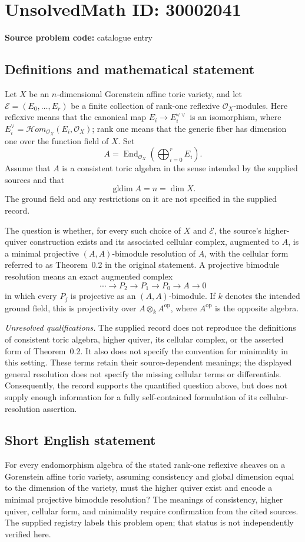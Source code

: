\documentclass[11pt]{article}
\begin{document}
\section*{UnsolvedMath ID: 30002041}
\textbf{Source problem code:} catalogue entry
\subsection{Definitions and mathematical statement}
Let \(X\) be an \(n\)-dimensional Gorenstein affine toric variety, and let \(\mathcal E=(E_0,\ldots,E_r)\) be a finite collection of rank-one reflexive \(\mathcal O_X\)-modules. Here reflexive means that the canonical map \(E_i\longrightarrow E_i^{\vee\vee}\) is an isomorphism, where \(E_i^\vee=\mathcal Hom_{\mathcal O_X}(E_i,\mathcal O_X)\); rank one means that the generic fiber has dimension one over the function field of \(X\). Set
\[
A=\operatorname{End}_{\mathcal O_X}\!\left(\bigoplus_{i=0}^{r}E_i\right).
\]
Assume that \(A\) is a consistent toric algebra in the sense intended by the supplied sources and that
\[
\operatorname{gldim}A=n=\dim X.
\]
The ground field and any restrictions on it are not specified in the supplied record.

The question is whether, for every such choice of \(X\) and \(\mathcal E\), the source's higher-quiver construction exists and its associated cellular complex, augmented to \(A\), is a minimal projective \((A,A)\)-bimodule resolution of \(A\), with the cellular form referred to as Theorem~0.2 in the original statement. A projective bimodule resolution means an exact augmented complex
\[
\cdots\longrightarrow P_2\longrightarrow P_1\longrightarrow P_0\longrightarrow A\longrightarrow 0
\]
in which every \(P_j\) is projective as an \((A,A)\)-bimodule. If \(k\) denotes the intended ground field, this is projectivity over \(A\otimes_k A^{\mathrm{op}}\), where \(A^{\mathrm{op}}\) is the opposite algebra.

\emph{Unresolved qualifications.} The supplied record does not reproduce the definitions of consistent toric algebra, higher quiver, its cellular complex, or the asserted form of Theorem~0.2. It also does not specify the convention for minimality in this setting. These terms retain their source-dependent meanings; the displayed general resolution does not specify the missing cellular terms or differentials. Consequently, the record supports the quantified question above, but does not supply enough information for a fully self-contained formulation of its cellular-resolution assertion.
\subsection{Short English statement}
For every endomorphism algebra of the stated rank-one reflexive sheaves on a Gorenstein affine toric variety, assuming consistency and global dimension equal to the dimension of the variety, must the higher quiver exist and encode a minimal projective bimodule resolution? The meanings of consistency, higher quiver, cellular form, and minimality require confirmation from the cited sources. The supplied registry labels this problem open; that status is not independently verified here.
\end{document}
